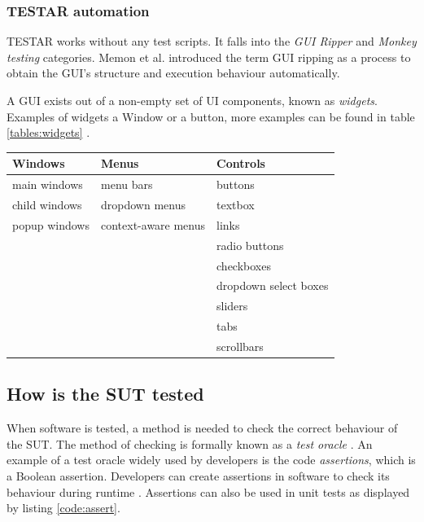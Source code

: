     \subsubsection{TESTAR automation} \label{testar-testauto}
    TESTAR works without any test scripts. It falls into the \emph{GUI Ripper} and \emph{Monkey testing} categories. Memon et al. introduced the term GUI ripping \cite{gui-ripping} as a process to obtain the GUI's structure and execution behaviour automatically.

    A GUI exists out of a non-empty set of UI components, known as \emph{widgets}. Examples of widgets a Window or a button, more examples can be found in table \ref{tables:widgets} \cite{VosAho2021}. 

        \begin{tabularx}{\textwidth}{ 
          | >{\raggedright\arraybackslash}X 
          | >{\raggedright\arraybackslash}X 
          | >{\raggedright\arraybackslash}X | }
            \hline
            Windows & Menus & Controls \\
            \hline
            \hline
            main windows & menu bars & buttons \\
            child windows & dropdown menus & textbox \\
            popup windows & context-aware menus & links \\
            && radio buttons \\
            && checkboxes\\
            && dropdown select boxes\\
            && sliders\\
            && tabs\\
            && scrollbars \\
            \hline
        \end{tabularx}
        \label{tables:widgets}
        
        

    \subsection{How is the SUT tested}
    When software is tested, a method is needed to check the correct behaviour of the SUT. The method of checking is formally known as a \emph{test oracle} \cite{testOracles}. An example of a test oracle widely used by developers is the code \emph{assertions}, which is a Boolean assertion. Developers can create assertions in software to check its behaviour during runtime \cite{barr2014oracle}. Assertions can also be used in unit tests as displayed by listing \ref{code:assert}. 


